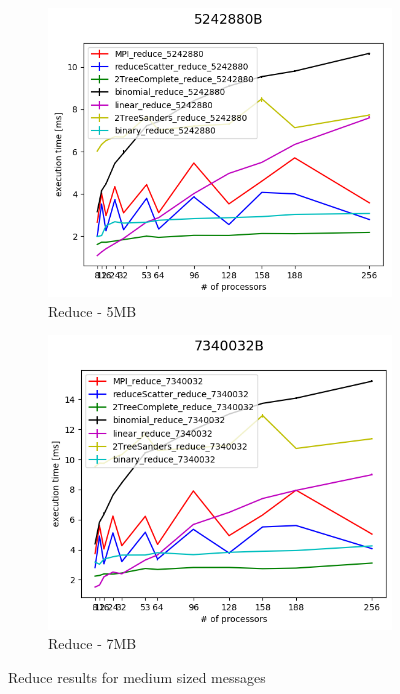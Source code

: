 \documentclass[sigplan,review,anonymous]{acmart}\settopmatter{printfolios=true,printccs=false,printacmref=false}
\begin{document}
\begin{figure}
\centering
\begin{subfigure}{.25\textwidth}
  \centering
  \includegraphics[width=1\linewidth]{images/Results/Reduce_all_5242880B.png}
  \caption{Reduce - 5MB}
  \label{reduce-selected-5MB}
\end{subfigure}%
\begin{subfigure}{.25\textwidth}
  \centering
  \includegraphics[width=1\linewidth]{images/Results/Reduce_all_7340032B.png}
  \caption{Reduce - 7MB}
  \label{reduce-selected-7MB}
\end{subfigure}
\caption{Reduce results for medium sized messages}
\label{graph-reduce-medium2-selected}
\end{figure}
\end{document}
